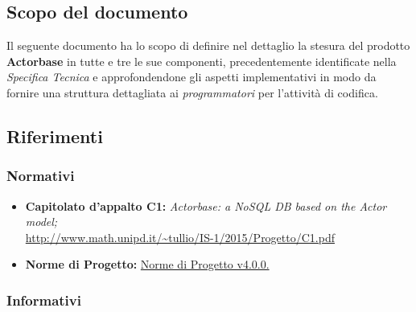 \documentclass{scalatekids-article}
\begin{document}
\subsection{Scopo del documento}

Il seguente documento ha lo scopo di definire nel dettaglio la stesura del
prodotto \textbf{Actorbase} in tutte e tre le sue componenti, precedentemente
identificate nella \textit{Specifica Tecnica} e approfondendone gli aspetti
implementativi in modo da fornire una struttura dettagliata ai
\textit{programmatori} per l'attività di codifica.

\prodPurpose

\glossExpl

\subsection{Riferimenti}

\subsubsection{Normativi}

\begin{itemize}

\item\textbf{Capitolato d'appalto C1:} \textit{Actorbase: a NoSQL DB based on the Actor model;}\\
  \url{http://www.math.unipd.it/~tullio/IS-1/2015/Progetto/C1.pdf}
\item\textbf{Norme di Progetto:}
  \href{run:../Interni/NormeDiProgetto\_v4.0.0.pdf}{Norme di Progetto v4.0.0.}
\end{itemize}

\subsubsection{Informativi}
\end{document}
